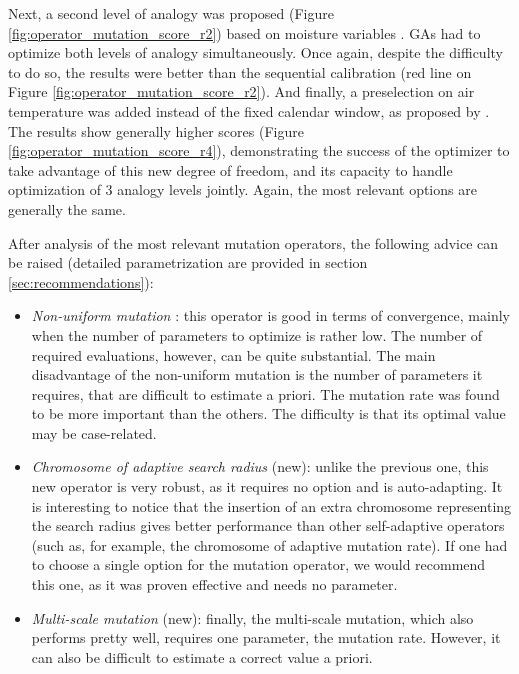 \documentclass{ametsoc}
\begin{document}
Next, a second level of analogy was proposed (Figure \ref{fig:operator_mutation_score_r2}) based on moisture variables \citep[see][]{Bontron2004, Horton2016}. GAs had to optimize both levels of analogy simultaneously. Once again, despite the difficulty to do so, the results were better than the sequential calibration (red line on Figure \ref{fig:operator_mutation_score_r2}). And finally, a preselection on air temperature was added instead of the fixed calendar window, as proposed by \cite{BenDaoud2015}. The results show generally higher scores (Figure \ref{fig:operator_mutation_score_r4}), demonstrating the success of the optimizer to take advantage of this new degree of freedom, and its capacity to handle optimization of 3 analogy levels jointly. Again, the most relevant options are generally the same.

After analysis of the most relevant mutation operators, the following advice can be raised (detailed parametrization are provided in section \ref{sec:recommendations}):

\begin{itemize}
	
	\item \textit{Non-uniform mutation} \citep{Michalewicz1996}: this operator is good in terms of convergence, mainly when the number of parameters to optimize is rather low. The number of required evaluations, however, can be quite substantial. The main disadvantage of the non-uniform mutation is the number of parameters it requires, that are difficult to estimate a priori. The mutation rate was found to be more important than the others. The difficulty is that its optimal value may be case-related.
	
	\item \textit{Chromosome of adaptive search radius} (new): unlike the previous one, this new operator is very robust, as it requires no option and is auto-adapting. It is interesting to notice that the insertion of an extra chromosome representing the search radius gives better performance than other self-adaptive operators (such as, for example, the chromosome of adaptive mutation rate). If one had to choose a single option for the mutation operator, we would recommend this one, as it was proven effective and needs no parameter.
	
	\item \textit{Multi-scale mutation} (new): finally, the multi-scale mutation, which also performs pretty well, requires one parameter, the mutation rate. However, it can also be difficult to estimate a correct value a priori.
	
\end{itemize}
\end{document}
